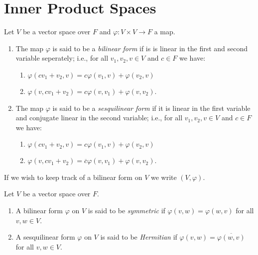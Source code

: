 \newpage
\section{Inner Product Spaces}

    \begin{definition}
        Let $V$ be a vector space over $F$ and $\varphi:V \times V \rightarrow F$ a map.
            \begin{enumerate}[label = (\arabic*),itemsep=0pt,topsep=3pt]
                \item The map $\varphi$ is said to be a \textit{bilinear form} if is is linear in the first and second variable seperately; i.e., for all $v_1,v_2,v \in V$ and $c \in F$ we have:
                    \begin{enumerate}[label = (\roman*),itemsep=1pt,topsep=0pt]
                        \item $\varphi(cv_1 +v_2,v) = c\varphi(v_1,v) + \varphi(v_2,v)$
                        \item $\varphi(v,cv_1 + v_2) = c\varphi(v,v_1) + \varphi(v,v_2)$.
                    \end{enumerate}

                \item The map $\varphi$ is said to be a \textit{sesquilinear form} if it is linear in the first variable and conjugate linear in the second variable; i.e., for all $v_1,v_2,v \in V$ and $c \in F$ we have:
                    \begin{enumerate}[label = (\roman*),itemsep=1pt,topsep=0pt]
                        \item $\varphi(cv_1 +v_2,v) = c\varphi(v_1,v) + \varphi(v_2,v)$
                        \item $\varphi(v,cv_1 + v_2) = \overline{c}\varphi(v,v_1) + \varphi(v,v_2)$.
                    \end{enumerate}
            \end{enumerate}
        If we wish to keep track of a bilinear form on $V$ we write $(V,\varphi)$.
    \end{definition}

    \begin{definition}
        Let $V$ be a vector space over $F$.
            \begin{enumerate}[label = (\arabic*),itemsep=1pt,topsep=3pt]
                \item A bilinear form $\varphi$ on $V$ is said to be \textit{symmetric} if $\varphi(v,w) = \varphi(w,v)$ for all $v,w \in V$.
                \item A sesquilinear form $\varphi$ on $V$ is said to be \textit{Hermitian} if $\varphi(v,w) = \overline{\varphi(w,v)}$ for all $v,w \in V$.
            \end{enumerate}
    \end{definition}

